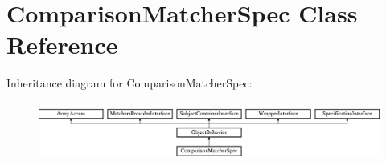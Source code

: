 \section{Comparison\+Matcher\+Spec Class Reference}
\label{classspec_1_1_php_spec_1_1_matcher_1_1_comparison_matcher_spec}
Inheritance diagram for Comparison\+Matcher\+Spec\+:\begin{figure}[H]
\begin{center}
\leavevmode
\includegraphics[height=1.953488cm]{classspec_1_1_php_spec_1_1_matcher_1_1_comparison_matcher_spec}
\end{center}
\end{figure}
